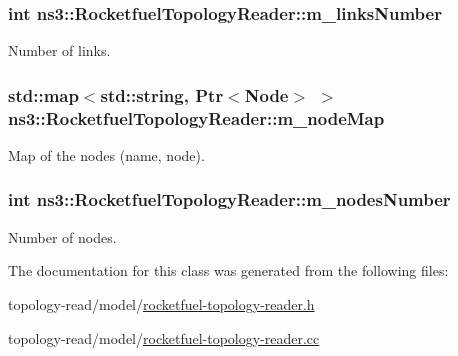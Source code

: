 \subsubsection[{\texorpdfstring{m\+\_\+links\+Number}{m_linksNumber}}]{\setlength{\rightskip}{0pt plus 5cm}int ns3\+::\+Rocketfuel\+Topology\+Reader\+::m\+\_\+links\+Number\hspace{0.3cm}{\ttfamily [private]}}\hypertarget{classns3_1_1RocketfuelTopologyReader_af05d006d96b5314535548ec5f6b82ecc}{}\label{classns3_1_1RocketfuelTopologyReader_af05d006d96b5314535548ec5f6b82ecc}


Number of links. 

\subsubsection[{\texorpdfstring{m\+\_\+node\+Map}{m_nodeMap}}]{\setlength{\rightskip}{0pt plus 5cm}std\+::map$<$std\+::string, {\bf Ptr}$<${\bf Node}$>$ $>$ ns3\+::\+Rocketfuel\+Topology\+Reader\+::m\+\_\+node\+Map\hspace{0.3cm}{\ttfamily [private]}}\hypertarget{classns3_1_1RocketfuelTopologyReader_a67cfa4105f0424a6bd04479437c8dd7e}{}\label{classns3_1_1RocketfuelTopologyReader_a67cfa4105f0424a6bd04479437c8dd7e}


Map of the nodes (name, node). 

\subsubsection[{\texorpdfstring{m\+\_\+nodes\+Number}{m_nodesNumber}}]{\setlength{\rightskip}{0pt plus 5cm}int ns3\+::\+Rocketfuel\+Topology\+Reader\+::m\+\_\+nodes\+Number\hspace{0.3cm}{\ttfamily [private]}}\hypertarget{classns3_1_1RocketfuelTopologyReader_a7e820cdd94908dc1665d0530d5566ada}{}\label{classns3_1_1RocketfuelTopologyReader_a7e820cdd94908dc1665d0530d5566ada}


Number of nodes. 



The documentation for this class was generated from the following files\+:\begin{DoxyCompactItemize}
\item 
topology-\/read/model/\hyperlink{rocketfuel-topology-reader_8h}{rocketfuel-\/topology-\/reader.\+h}\item 
topology-\/read/model/\hyperlink{rocketfuel-topology-reader_8cc}{rocketfuel-\/topology-\/reader.\+cc}\end{DoxyCompactItemize}
